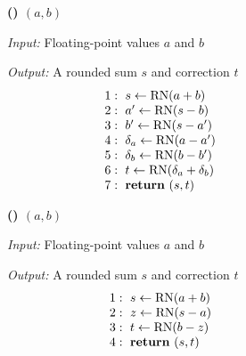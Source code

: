 \begin{figure}[t]
  \centering
  \begingroup
  \setlength{\fboxsep}{6pt}
  \begin{subfigure}[t]{\columnwidth}
    \label{alg:two-sum}
    \colorbox{gray!3}{%
      \begin{minipage}[t]{\dimexpr\linewidth-2\fboxsep\relax}
        \centering
        \textbf{(\thesubfigure) \TwoSum{}$(a,b)$}
        \par\smallskip
        \raggedright\small
        \textit{Input:} Floating-point values $a$ and $b$\par
        \textit{Output:} A rounded sum $s$ and correction $t$
        \setlength{\abovedisplayskip}{4pt}
        \setlength{\belowdisplayskip}{0pt}
        \[
          \begin{array}{@{}r@{\hspace{0.6em}}l@{}}
            1: & s \leftarrow \operatorname{RN}(a+b)\\
            2: & a' \leftarrow \operatorname{RN}(s-b)\\
            3: & b' \leftarrow \operatorname{RN}(s-a')\\
            4: & \delta_a \leftarrow \operatorname{RN}(a-a')\\
            5: & \delta_b \leftarrow \operatorname{RN}(b-b')\\
            6: & t \leftarrow \operatorname{RN}(\delta_a+\delta_b)\\
            7: & \mathbf{return}\ (s,t)
          \end{array}
        \]
      \end{minipage}}
  \end{subfigure}

  \vspace{7pt}

  \begin{subfigure}[t]{\columnwidth}
    \label{alg:fast-two-sum}
    \colorbox{gray!3}{%
      \begin{minipage}[t]{\dimexpr\linewidth-2\fboxsep\relax}
        \centering
        \textbf{(\thesubfigure) \FastTwoSum{}$(a,b)$}
        \par\smallskip
        \raggedright\small
        \textit{Input:} Floating-point values $a$ and $b$\par
        \textit{Output:} A rounded sum $s$ and correction $t$
        \setlength{\abovedisplayskip}{4pt}
        \setlength{\belowdisplayskip}{0pt}
        \[
          \begin{array}{@{}r@{\hspace{0.6em}}l@{}}
            1: & s \leftarrow \operatorname{RN}(a+b)\\
            2: & z \leftarrow \operatorname{RN}(s-a)\\
            3: & t \leftarrow \operatorname{RN}(b-z)\\
            4: & \mathbf{return}\ (s,t)
          \end{array}
        \]
      \end{minipage}}
  \end{subfigure}


\end{figure}
